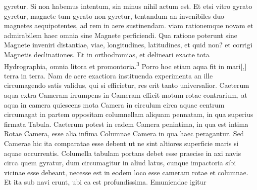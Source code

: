 {gyretur. Si non habemus intentum, sin minus nihil actum est. Et etsi vitro gyrato gyretur, magnete\protect{} tum gyrato non gyretur, tentandum an invenibiles duo magnetes\protect{} aequipotentes, ad rem in aere sustinendam.} viam rationemque novam et admirabilem haec omnia sine Magnete\protect{} perficiendi. Qua ratione poterunt sine Magnete\protect{} inveniri distantiae, viae, longitudines\protect{}, latitudines\protect{}, et quid non? et corrigi Magnetis\protect{} declinationes\protect{}. Et  in orthodromias, et delineari exacte tota Hydrographia, omnia litora et promontoria.\textsuperscript{3} Porro hoc etiam aqua fit in mari[,] terra in terra. Nam de aere exactiora instituenda experimenta an ille circumagendo satis validus, qui si efficietur, res erit tanto universalior. Caeterum aqua extra Cameram irrumpens in Cameram efficit motum rotae\protect{}  contrarium, at aqua in camera quiescens mota Camera in circulum circa aquae centrum circumagat in partem oppositam columnellam aliquam pennatam, in qua superius firmata Tabula. Caeterum potest in eadem Camera penintima, in qua est intima Rotae\protect{} Camera, esse alia infima Columnae Camera in qua haec peragantur. Sed Camerae hic ita comparatae esse debent ut ne sint altiores superficie maris si aquae occurrentis. Columella tabulam portans debet esse praecise in axi navis\protect{} circa quem gyratur, dum circumagitur in aliud latus, cunque 
impactoria sibi vicinae esse debeant, necesse est in eodem loco esse cameram rotae\protect{} et columnae. Et ita sub navi\protect{} erunt, ubi ea est profundissima. Emuniendae igitur 

